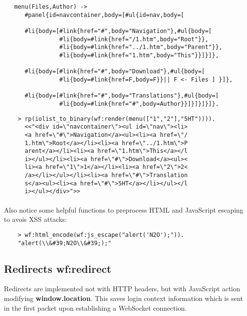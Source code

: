 \vspace{1\baselineskip}
\begin{lstlisting}
   menu(Files,Author) ->
      #panel{id=navcontainer,body=[#ul{id=nav,body=[

      #li{body=[#link{href="#",body="Navigation"},#ul{body=[
                #li{body=#link{href="/1.htm",body="Root"}},
                #li{body=#link{href="../1.htm",body="Parent"}},
                #li{body=#link{href="1.htm",body="This"}}]}]},

      #li{body=[#link{href="#",body="Download"},#ul{body=[
                #li{body=#link{href=F,body=F}}|| F <- Files ] }]},

      #li{body=[#link{href="#",body="Translations"},#ul{body=[
                #li{body=#link{href="#",body=Author}}]}]}]}]}.
\end{lstlisting}
\vspace{1\baselineskip}

\vspace{1\baselineskip}
\begin{lstlisting}
    > rp(iolist_to_binary(wf:render(menu(["1","2"],"5HT")))).
      <<"<div id=\"navcontainer\"><ul id=\"nav\"><li>
      <a href=\"#\">Navigation</a><ul><li><a href=\"/
      1.htm\">Root</a></li><li><a href=\"../1.htm\">P
      arent</a></li><li><a href=\"1.htm\">This</a></l
      i></ul></li><li><a href=\"#\">Download</a><ul><
      li><a href=\"1\">1</a></li><li><a href=\"2\">2<
      /a></li></ul></li><li><a href=\"#\">Translation
      s</a><ul><li><a href=\"#\">5HT</a></li></ul></l
      i></ul></div>">>
\end{lstlisting}
\vspace{1\baselineskip}

\paragraph{}
Also notice some helpful functions to preprocess HTML and JavaScript
escaping to avois XSS attacks:

\vspace{1\baselineskip}
\begin{lstlisting}
    > wf:html_encode(wf:js_escape("alert('N2O');")).
    "alert(\\&#39;N2O\\&#39;);"
\end{lstlisting}
\vspace{1\baselineskip}

\subsection{Redirects {\bf wf:redirect}}
Redirects are implemented not with HTTP headers, but with JavaScript action modifying {\bf window.location}.
This saves login context information which is sent in the first packet upon establishing a WebSocket connection.

